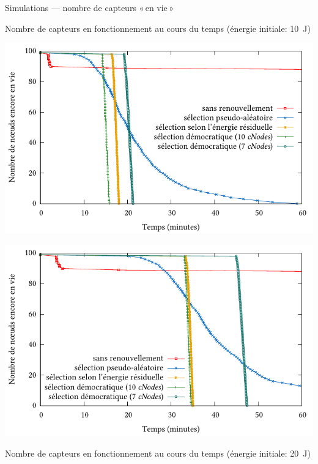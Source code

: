 \documentclass[aspectratio=43]{beamer} %
\begin{document}
\begin{frame}{Simulations --- nombre de capteurs «\,en vie\,»}
  \begin{minipage}[c][.48\textheight][t]{.34\textwidth}
    \raggedright\medskip
    Nombre de capteurs en fonctionnement au cours du temps (énergie initiale: 10~J)
  \end{minipage}
  \begin{minipage}{.65\textwidth}
    \raggedleft
    \includegraphics[height=.48\textheight]{Figs/plot_sd_nbnodesXtime_10J.pdf}
  \end{minipage}
  \begin{minipage}{.65\textwidth}
    \includegraphics[height=.48\textheight]{Figs/plot_sd_nbnodesXtime_20J.pdf}
  \end{minipage}
  \begin{minipage}[c][.48\textheight][b]{.34\textwidth}
    \raggedright
    Nombre de capteurs en fonctionnement au cours du temps (énergie initiale: 20~J)
    \bigskip
  \end{minipage}
\end{frame}
\end{document}
